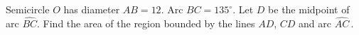 Semicircle $O$ has diameter $AB=12$. Arc $BC=135^{\circ}$. Let $D$ be the midpoint of arc $\widehat{BC}$. Find the area of the region bounded by the lines $AD$, $CD$ and arc $\widehat{AC}\,$.
